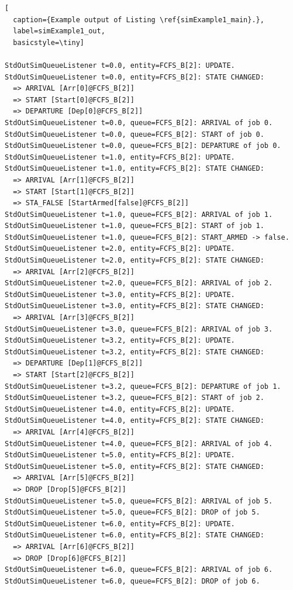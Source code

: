 \documentclass[12pt]{book}
\begin{document}
\begin{lstlisting}[
  caption={Example output of Listing \ref{simExample1_main}.},
  label=simExample1_out,
  basicstyle=\tiny]

StdOutSimQueueListener t=0.0, entity=FCFS_B[2]: UPDATE.
StdOutSimQueueListener t=0.0, entity=FCFS_B[2]: STATE CHANGED:
  => ARRIVAL [Arr[0]@FCFS_B[2]]
  => START [Start[0]@FCFS_B[2]]
  => DEPARTURE [Dep[0]@FCFS_B[2]]
StdOutSimQueueListener t=0.0, queue=FCFS_B[2]: ARRIVAL of job 0.
StdOutSimQueueListener t=0.0, queue=FCFS_B[2]: START of job 0.
StdOutSimQueueListener t=0.0, queue=FCFS_B[2]: DEPARTURE of job 0.
StdOutSimQueueListener t=1.0, entity=FCFS_B[2]: UPDATE.
StdOutSimQueueListener t=1.0, entity=FCFS_B[2]: STATE CHANGED:
  => ARRIVAL [Arr[1]@FCFS_B[2]]
  => START [Start[1]@FCFS_B[2]]
  => STA_FALSE [StartArmed[false]@FCFS_B[2]]
StdOutSimQueueListener t=1.0, queue=FCFS_B[2]: ARRIVAL of job 1.
StdOutSimQueueListener t=1.0, queue=FCFS_B[2]: START of job 1.
StdOutSimQueueListener t=1.0, queue=FCFS_B[2]: START_ARMED -> false.
StdOutSimQueueListener t=2.0, entity=FCFS_B[2]: UPDATE.
StdOutSimQueueListener t=2.0, entity=FCFS_B[2]: STATE CHANGED:
  => ARRIVAL [Arr[2]@FCFS_B[2]]
StdOutSimQueueListener t=2.0, queue=FCFS_B[2]: ARRIVAL of job 2.
StdOutSimQueueListener t=3.0, entity=FCFS_B[2]: UPDATE.
StdOutSimQueueListener t=3.0, entity=FCFS_B[2]: STATE CHANGED:
  => ARRIVAL [Arr[3]@FCFS_B[2]]
StdOutSimQueueListener t=3.0, queue=FCFS_B[2]: ARRIVAL of job 3.
StdOutSimQueueListener t=3.2, entity=FCFS_B[2]: UPDATE.
StdOutSimQueueListener t=3.2, entity=FCFS_B[2]: STATE CHANGED:
  => DEPARTURE [Dep[1]@FCFS_B[2]]
  => START [Start[2]@FCFS_B[2]]
StdOutSimQueueListener t=3.2, queue=FCFS_B[2]: DEPARTURE of job 1.
StdOutSimQueueListener t=3.2, queue=FCFS_B[2]: START of job 2.
StdOutSimQueueListener t=4.0, entity=FCFS_B[2]: UPDATE.
StdOutSimQueueListener t=4.0, entity=FCFS_B[2]: STATE CHANGED:
  => ARRIVAL [Arr[4]@FCFS_B[2]]
StdOutSimQueueListener t=4.0, queue=FCFS_B[2]: ARRIVAL of job 4.
StdOutSimQueueListener t=5.0, entity=FCFS_B[2]: UPDATE.
StdOutSimQueueListener t=5.0, entity=FCFS_B[2]: STATE CHANGED:
  => ARRIVAL [Arr[5]@FCFS_B[2]]
  => DROP [Drop[5]@FCFS_B[2]]
StdOutSimQueueListener t=5.0, queue=FCFS_B[2]: ARRIVAL of job 5.
StdOutSimQueueListener t=5.0, queue=FCFS_B[2]: DROP of job 5.
StdOutSimQueueListener t=6.0, entity=FCFS_B[2]: UPDATE.
StdOutSimQueueListener t=6.0, entity=FCFS_B[2]: STATE CHANGED:
  => ARRIVAL [Arr[6]@FCFS_B[2]]
  => DROP [Drop[6]@FCFS_B[2]]
StdOutSimQueueListener t=6.0, queue=FCFS_B[2]: ARRIVAL of job 6.
StdOutSimQueueListener t=6.0, queue=FCFS_B[2]: DROP of job 6.

\end{lstlisting}
\end{document}

